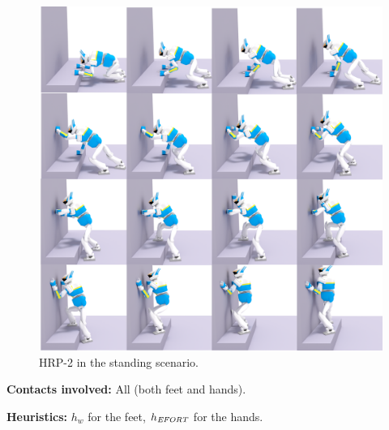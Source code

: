 \documentclass[journal]{IEEEtran}
\newcommand{\commentt}[2]{\textcolor{#1}{\textbf{\textit{[#2]}}}} 	%
\newcommand{\adnote}[1]{\commentt{blue}{AD: #1}}
\newcommand{\gls}[1]{\textit{#1}}
\begin{document}
\begin{figure}
  \centering
  \includegraphics[width=1\linewidth]{figures/standing}
  \caption{
           HRP-2 in the standing scenario. }
		   \label{fig:standing}
\end{figure}


\noindent\textbf{Contacts involved:} All (both feet and hands).

\noindent\textbf{Heuristics:} $h_w$ for the feet, $h_{\textrm{\it EFORT}}$  for the hands.

\end{document}
